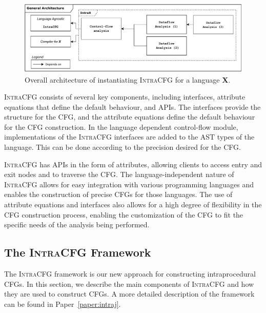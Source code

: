 \begin{figure}[H]
    \centering
    \includegraphics[width=1\textwidth]{kappa/img/architecture.pdf}
    \caption{\label{fig:intraCFG} Overall architecture of instantiating \textsc{IntraCFG} for a language \textbf{X}.}
\end{figure}

\textsc{IntraCFG} consists of several key components, including interfaces, attribute equations that define the
default behaviour, and APIs. The interfaces provide the structure for the
CFG, and the attribute equations define the default behaviour for the CFG
construction.
In the language dependent control-flow module, implementations of the \textsc{IntraCFG}
interfaces are added to the AST types of the language. This can be done according to the
precision desired for the CFG.

\textsc{IntraCFG} has APIs in the form of attributes, allowing clients to access entry
and exit nodes and to traverse the CFG.
The language-independent nature of \textsc{IntraCFG} allows for easy integration
with various programming languages and enables the construction of precise CFGs
for those languages. The use of attribute equations and interfaces also allows
for a high degree of flexibility in the CFG construction process,
enabling the customization of the CFG to fit the specific needs of the
analysis being performed.


\subsection{The \textsc{IntraCFG} Framework}
The \textsc{IntraCFG} framework is our new approach for constructing intraprocedural 
CFGs.
In this section, we describe the main components of \textsc{IntraCFG} and how they are used to construct CFGs.
A more detailed description of the framework can be found in Paper~\ref{paper:intraj}.

